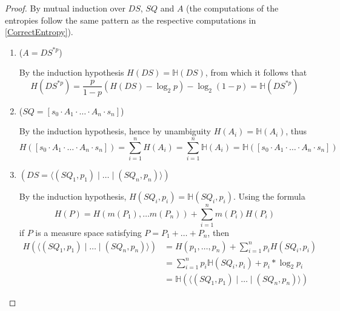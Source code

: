 \documentclass[acmsmall,screen,anonymous]{acmart}
\begin{document}
\begin{proof}
By mutual induction over $DS$, $SQ$ and $A$ (the computations of the entropies follow the same pattern as the respective computations in \cref{CorrectEntropy}).
\begin{enumerate}
\item
($A = DS^{*p}$)

By the induction hypothesis $H(DS) = \mathbb{H}(DS)$, from which it follows that
$$H(DS^{*p}) = \frac{p}{1-p}(H(DS) - \log_2 p) - \log_2 (1-p) = \mathbb{H}(DS^{*p})$$
\item
($SQ = [s_0 \cdot A_1 \cdot \ldots \cdot A_n \cdot s_n]$)

By the induction hypothesis, hence by unambiguity $H(A_i) = \mathbb{H}(A_i)$, thus
$$H([s_0 \cdot A_1 \cdot \ldots \cdot A_n \cdot s_n]) = \sum_{i=1}^n H(A_i) = \sum_{i=1}^n \mathbb{H}(A_i) = \mathbb{H}([s_0 \cdot A_1 \cdot \ldots \cdot A_n \cdot s_n])$$
\item
$(DS = \langle (SQ_1, p_1) \; | \; \ldots \; | \; (SQ_n, p_n)\rangle)$

By the induction hypothesis, $H(SQ_i, p_i) = \mathbb{H}(SQ_i, p_i)$. Using the formula
$$H(P) = H(m(P_1), \ldots m(P_n)) + \sum_{i=1}^n m(P_i)H(P_i)$$
if $P$ is a measure space satisfying $P = P_1 + \ldots + P_n$, then
\begin{align*}
H(\langle (SQ_1, p_1) \; | \; \ldots \; | \; (SQ_n, p_n)\rangle)
&= H(p_1, \ldots, p_n) + \sum_{i=1}^n p_i H(SQ_i, p_i)\\
&= \sum_{i=1}^n p_i \mathbb{H}(SQ_i, p_i) + p_i * \log_2 p_i\\
&= \mathbb{H}(\langle (SQ_1, p_1) \; | \; \ldots \; | \; (SQ_n, p_n)\rangle)
\end{align*}
\end{enumerate}
\end{proof}
\end{document}
